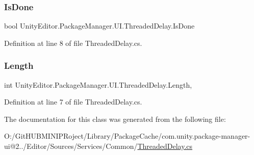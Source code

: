 \subsubsection{\texorpdfstring{IsDone}{IsDone}}
{\footnotesize\ttfamily bool Unity\+Editor.\+Package\+Manager.\+U\+I.\+Threaded\+Delay.\+Is\+Done\hspace{0.3cm}{\ttfamily [get]}}



Definition at line 8 of file Threaded\+Delay.\+cs.

\mbox{\label{class_unity_editor_1_1_package_manager_1_1_u_i_1_1_threaded_delay_a13ad6e3fbdb6a07ad15826fc346d3fe4}} 
\subsubsection{\texorpdfstring{Length}{Length}}
{\footnotesize\ttfamily int Unity\+Editor.\+Package\+Manager.\+U\+I.\+Threaded\+Delay.\+Length\hspace{0.3cm}{\ttfamily [get]}, {\ttfamily [set]}}



Definition at line 7 of file Threaded\+Delay.\+cs.



The documentation for this class was generated from the following file\+:\begin{DoxyCompactItemize}
\item 
O\+:/\+Git\+H\+U\+B\+M\+I\+N\+I\+P\+Roject/\+Library/\+Package\+Cache/com.\+unity.\+package-\/manager-\/ui@2../\+Editor/\+Sources/\+Services/\+Common/\mbox{\hyperlink{_threaded_delay_8cs}{Threaded\+Delay.\+cs}}\end{DoxyCompactItemize}
